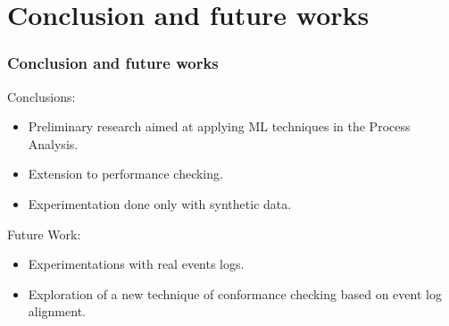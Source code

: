 \documentclass[10pt]{beamer}
\begin{document}
\section{Conclusion and future works}
\begin{frame}
\frametitle{Conclusion and future works}
Conclusions:
\begin{itemize}
\item Preliminary research aimed at applying ML techniques in the Process Analysis.
\item Extension to performance checking.
\item Experimentation done only with synthetic data.
\end{itemize}
\smallskip
\smallskip
\smallskip
Future Work:
\begin{itemize}
\item Experimentations with real events logs.
\item Exploration of a new technique of conformance checking based on event log alignment.
\end{itemize}

\end{frame}
\end{document}
